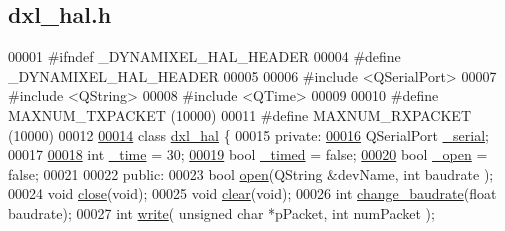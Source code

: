 \hypertarget{a00013_source}{}\subsection{dxl\+\_\+hal.\+h}
\label{a00013_source}

\begin{DoxyCode}
00001 \textcolor{preprocessor}{#ifndef \_DYNAMIXEL\_HAL\_HEADER}
00004 \textcolor{preprocessor}{#define \_DYNAMIXEL\_HAL\_HEADER}
00005 
00006 \textcolor{preprocessor}{#include <QSerialPort>}
00007 \textcolor{preprocessor}{#include <QString>}
00008 \textcolor{preprocessor}{#include <QTime>}
00009 
00010 \textcolor{preprocessor}{#define MAXNUM\_TXPACKET  (10000)}
00011 \textcolor{preprocessor}{#define MAXNUM\_RXPACKET  (10000)}
00012 
\hypertarget{a00013_source_l00014}{}\hyperlink{a00003}{00014} \textcolor{keyword}{class }\hyperlink{a00003}{dxl\_hal} \{
00015 \textcolor{keyword}{private}:
\hypertarget{a00013_source_l00016}{}\hyperlink{a00003_a785d0e35b81d779b54869cad668f9745}{00016}     QSerialPort \hyperlink{a00003_a785d0e35b81d779b54869cad668f9745}{\_serial};
00017     
\hypertarget{a00013_source_l00018}{}\hyperlink{a00003_ae3d8733b5ca778b070218765ca0746ac}{00018}     \textcolor{keywordtype}{int} \hyperlink{a00003_ae3d8733b5ca778b070218765ca0746ac}{\_time} = 30;
\hypertarget{a00013_source_l00019}{}\hyperlink{a00003_a10d474daa3ca42b5c5ceb6558a955ca1}{00019}     \textcolor{keywordtype}{bool} \hyperlink{a00003_a10d474daa3ca42b5c5ceb6558a955ca1}{\_timed} = \textcolor{keyword}{false};
\hypertarget{a00013_source_l00020}{}\hyperlink{a00003_a04831154c43fe4f7499ea0950e0f0999}{00020}     \textcolor{keywordtype}{bool} \hyperlink{a00003_a04831154c43fe4f7499ea0950e0f0999}{\_open} = \textcolor{keyword}{false};
00021     
00022 \textcolor{keyword}{public}:
00023     \textcolor{keywordtype}{bool} \hyperlink{a00003_ab631c2a5533125f14db9a8ec1c33aa7c}{open}(QString &devName, \textcolor{keywordtype}{int} baudrate );
00024     \textcolor{keywordtype}{void} \hyperlink{a00003_a250fd7e4acabf54d0733551a13e89a2d}{close}(\textcolor{keywordtype}{void});
00025     \textcolor{keywordtype}{void} \hyperlink{a00003_a004eedde5af69219d7288ec8ea97c89f}{clear}(\textcolor{keywordtype}{void});
00026     \textcolor{keywordtype}{int} \hyperlink{a00003_a0eaaa5340bc9dce73cc920dc8befe5b0}{change\_baudrate}(\textcolor{keywordtype}{float} baudrate);
00027     \textcolor{keywordtype}{int} \hyperlink{a00003_a90106970438fb0ab65852730a1c0776a}{write}( \textcolor{keywordtype}{unsigned} \textcolor{keywordtype}{char} *pPacket, \textcolor{keywordtype}{int} numPacket );

\end{DoxyCode}
